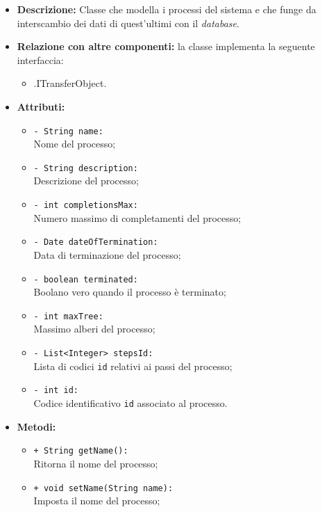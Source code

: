 \begin{flushleft}
\begin{itemize}
\item \textbf{Descrizione:} Classe che modella i processi del sistema e che funge da interscambio dei dati di quest'ultimi con il \textit{database}.
\item \textbf{Relazione con altre componenti:} la classe implementa la seguente interfaccia:
		\begin{itemize}
			\item \smodel{}.ITransferObject.
		\end{itemize}
\item \textbf{Attributi:}
\begin{sloppypar}
\begin{itemize}
\item \texttt{- String name:}\\ Nome del processo;
\item \texttt{- String description:}\\ Descrizione del processo;
\item \texttt{- int completionsMax:}\\ Numero massimo di completamenti del processo;
\item \texttt{- Date dateOfTermination:}\\ Data di terminazione del processo;
\item \texttt{- boolean terminated:}\\ Boolano vero quando il processo è terminato;
\item \texttt{- int maxTree:}\\ Massimo alberi del processo;
\item \texttt{- List<Integer> stepsId:}\\ Lista di codici \texttt{id} relativi ai passi del processo;
\item \texttt{- int id:}\\ Codice identificativo \texttt{id} associato al processo.
\end{itemize}
\end{sloppypar}
\item \textbf{Metodi:}
\begin{sloppypar}
\begin{itemize}
\item \texttt{+ String getName():}\\ Ritorna il nome del processo;
\item \texttt{+ void setName(String name):}\\ Imposta il nome del processo;

\end{itemize}
\end{sloppypar}
\end{itemize}
\end{flushleft}
